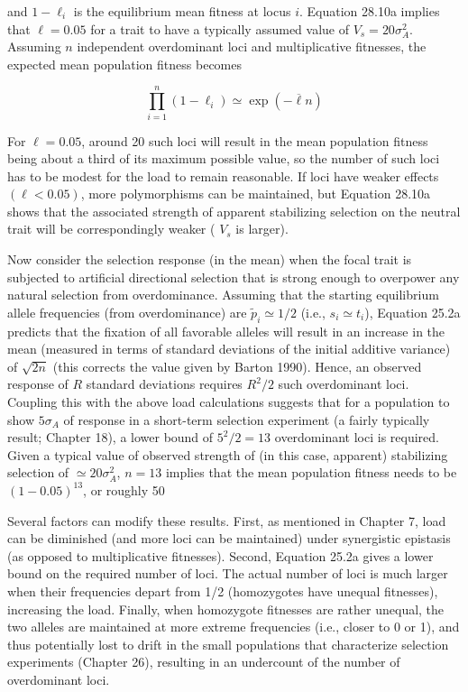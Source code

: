\documentclass{article}
\begin{document}
and $1-\ell_i$ is the equilibrium mean fitness at locus $i$. Equation 28.10a implies that $\ell=0.05$ for a trait to have a typically assumed value of $V_s=20\sigma_A^2$. Assuming $n$ independent overdominant loci and multiplicative fitnesses, the expected mean population fitness becomes

\begin{equation}
\prod_{i=1}^{n}(1-\ell_{i})\simeq\exp(-\overline{\ell}n)
\end{equation}

For  $ \ell = 0.05 $, around 20 such loci will result in the mean population fitness being about a third of its maximum possible value, so the number of such loci has to be modest for the load to remain reasonable. If loci have weaker effects  $ (\ell < 0.05) $, more polymorphisms can be maintained, but Equation 28.10a shows that the associated strength of apparent stabilizing selection on the neutral trait will be correspondingly weaker ( $ V_s $ is larger).

Now consider the selection response (in the mean) when the focal trait is subjected to artificial directional selection that is strong enough to overpower any natural selection from overdominance. Assuming that the starting equilibrium allele frequencies (from overdominance) are  $ \widetilde{p}_i \simeq 1/2 $ (i.e.,  $ s_i \simeq t_i $), Equation 25.2a predicts that the fixation of all favorable alleles will result in an increase in the mean (measured in terms of standard deviations of the initial additive variance) of  $ \sqrt{2n} $ (this corrects the value given by Barton 1990). Hence, an observed response of  $ R $ standard deviations requires  $ R^2 / 2 $ such overdominant loci. Coupling this with the above load calculations suggests that for a population to show  $ 5\sigma_A $ of response in a short-term selection experiment (a fairly typically result; Chapter 18), a lower bound of  $ 5^2 / 2 = 13 $ overdominant loci is required. Given a typical value of observed strength of (in this case, apparent) stabilizing selection of  $ \simeq 20\sigma_A^2 $,  $ n = 13 $ implies that the mean population fitness needs to be  $ (1 - 0.05)^{13} $, or roughly 50%

Several factors can modify these results. First, as mentioned in Chapter 7, load can be diminished (and more loci can be maintained) under synergistic epistasis (as opposed to multiplicative fitnesses). Second, Equation 25.2a gives a lower bound on the required number of loci. The actual number of loci is much larger when their frequencies depart from 1/2 (homozygotes have unequal fitnesses), increasing the load. Finally, when homozygote fitnesses are rather unequal, the two alleles are maintained at more extreme frequencies (i.e., closer to 0 or 1), and thus potentially lost to drift in the small populations that characterize selection experiments (Chapter 26), resulting in an undercount of the number of overdominant loci.
\end{document}
